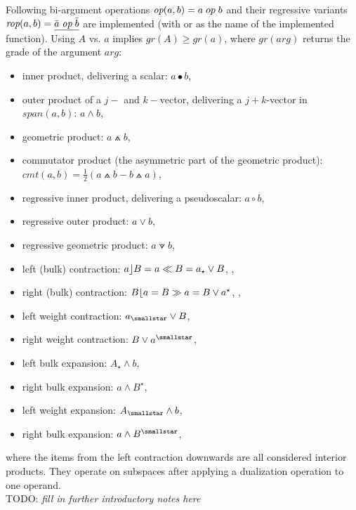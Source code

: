 Following bi-argument operations $\emph{op}(a,b) = a \; op \; b$ and their regressive
variants $\emph{rop}(a,b) = \underline{\bar{a} \; \emph{op} \; \bar{b}}$ are implemented
(with  or  as the name of the implemented function). Using
$A$ vs. $a$ implies $gr(A) \ge gr(a)$, where $gr(arg)$ returns the grade of the argument
$arg$:
\begin{itemize}
    \item inner product, delivering a scalar: $a \bullet b$, 
    \item outer product of a $j-$ and $k-$vector, delivering a $j+k$-vector in
    $span(a,b)$: $a \wedge b$, 
    \item geometric product:  $a \wedgedot b$, 
    \item commutator product (the asymmetric part of the geometric product): $cmt(a,b) =
    \frac{1}{2}(a \wedgedot b - b \wedgedot a)$,
    \item regressive inner product, delivering a pseudoscalar: $a \circ b$,
    \item regressive outer product: $a \vee b$, 
    \item regressive geometric product: $a \veedot b$, 
    
    \item left (bulk) contraction: $a \rfloor B = a \ll B = a_{\star} \vee B $,
    ,   
    \item right (bulk) contraction: $B \lfloor a = B \gg a = B \vee a^{\star} $,
    , 

    \item left weight contraction: $a_{\smallstar} \vee B $,
    \item right weight contraction: $B \vee a^{\smallstar} $,

    \item left bulk expansion: $A_{\star} \wedge b $,
    \item right bulk expansion: $a \wedge B^{\star} $,

    \item left weight expansion: $A_{\smallstar} \wedge b $,
    \item right bulk expansion: $a \wedge B^{\smallstar} $,
\end{itemize}
where the items from the left contraction downwards are all considered interior products.
They operate on subspaces after applying a dualization operation to one operand. \\


TODO: \emph{fill in further introductory notes here} \\

\newpage
